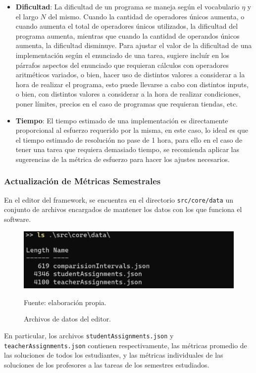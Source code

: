 \documentclass[letterpaper,12pt]{article}
\begin{document}
\begin{itemize}
  \item \textbf{Dificultad}: La dificultad de un programa se maneja según el vocabulario $\eta$ y el largo $N$ del mismo. Cuando la cantidad de operadores únicos aumenta, o cuando aumenta el total de operadores únicos utilizados, la dificultad del programa aumenta, mientras que cuando la cantidad de operandos únicos aumenta, la dificultad disminuye. Para ajustar el valor de la dificultad de una implementación según el enunciado de una tarea, sugiere incluír en los párrafos aspectos del enunciado que requieran cálculos con operadores aritméticos variados, o bien, hacer uso de distintos valores a considerar a la hora de realizar el programa, esto puede llevarse a cabo con distintos inputs, o bien, con distintos valores a considerar a la hora de realizar condiciones, poner límites, precios en el caso de programas que requieran tiendas, etc.
  \item \textbf{Tiempo}: El tiempo estimado de una implementación es directamente proporcional al esfuerzo requerido por la misma, en este caso, lo ideal es que el tiempo estimado de resolución no pase de 1 hora, para ello en el caso de tener una tarea que requiera demasiado tiempo, se recomienda aplicar las sugerencias de la métrica de esfuerzo para hacer los ajustes necesarios.
\end{itemize}

\subsubsection{Actualización de Métricas Semestrales}

En el editor del framework, se encuentra en el directorio \texttt{src/core/data} un conjunto de archivos encargados de mantener los datos con los que funciona el software.
\begin{figure}[H]
  \centering
  \includegraphics[width=1\textwidth]{figures/datafiles.png}
  \caption{Archivos de datos del editor.} Fuente: elaboración propia.
  \label{datafiles}
\end{figure}
En particular, los archivos \texttt{studentAssignments.json} y \texttt{teacherAssignments.json} contienen respectivamente, las métricas promedio de las soluciones de todos los estudiantes, y las métricas individuales de las soluciones de los profesores a las tareas de los semestres estudiados.
\end{document}
